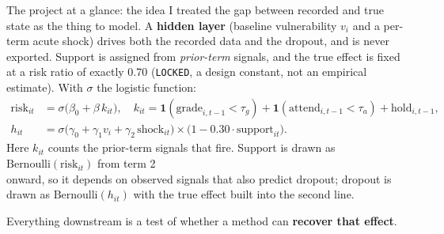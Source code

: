 \documentclass[aspectratio=169,11pt,t]{beamer}
\newcommand{\key}[1]{\textcolor{keyresult}{\textbf{#1}}}
\newcommand{\ptag}[1]{\texttt{\small #1}}
\begin{document}
\begin{frame}{The project at a glance: the idea}
  \small
  I treated the gap between recorded and true state as the thing to model. A
  \textbf{hidden layer} (baseline vulnerability $v_i$ and a per-term acute shock)
  drives both the recorded data and the dropout, and is never exported. Support
  is assigned from \emph{prior-term} signals, and the true effect is fixed at a
  risk ratio of exactly 0.70 (\ptag{LOCKED}, a design constant, not an empirical
  estimate). With $\sigma$ the logistic function:
    \begin{align*}
    \text{risk}_{it} &= \sigma\bigl(\beta_0 + \beta\,k_{it}\bigr),
      \quad k_{it} = \mathbf{1}(\text{grade}_{i,t-1}<\tau_g) + \mathbf{1}(\text{attend}_{i,t-1}<\tau_a) + \text{hold}_{i,t-1},\\
    h_{it} &= \sigma\bigl(\gamma_0 + \gamma_1 v_i + \gamma_2\,\text{shock}_{it}\bigr)\times\bigl(1 - 0.30\cdot\text{support}_{it}\bigr).
  \end{align*}
  \vspace*{-4pt}Here $k_{it}$ counts the prior-term signals that fire. Support is drawn as $\text{Bernoulli}(\text{risk}_{it})$ from term 2\vspace*{4pt}\\ onward, so it depends on observed
  signals that also predict dropout; dropout is drawn as
  $\text{Bernoulli}(h_{it})$ with the true effect built into the second line.
  \medskip

  \begin{keybox}\centering\small
    Everything downstream is a test of whether a method can \key{recover that effect}.
  \end{keybox}
\end{frame}
\end{document}
